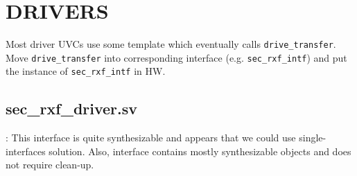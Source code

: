 \documentclass{note}
\begin{document}


\section{DRIVERS}
Most driver UVCs use some template which eventually calls 
\verb+drive_transfer+.  Move \verb+drive_transfer+ into 
corresponding interface (e.g. \verb+sec_rxf_intf+) and 
put the instance of \verb+sec_rxf_intf+ in HW.

\subsection{sec\_rxf\_driver.sv}

\bit
\w {}: This interface is quite synthesizable and appears that 
we could use single-interfaces solution. Also, interface contains mostly 
synthesizable objects and does not require clean-up.
\end{document}
